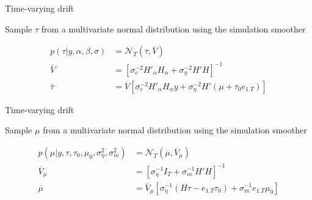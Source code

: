 \documentclass[notes,blackandwhite,mathsans,usenames,dvipsnames]{beamer}
\begin{document}
\begin{frame}{Time-varying drift}

{\color{mcxs2}Sample} $\tau$ {\color{mcxs2}from a multivariate normal distribution using the simulation smoother}

\begin{align*}
p\left( \tau|y,\alpha,\beta,\sigma \right)&= \mathcal{N}_T\left(\overline{\tau},\overline{V}\right)\\[2ex]
\overline{V} &= \left[\sigma^{-2} _eH'_\alpha H_\alpha + \sigma^{-2} _\eta H' H \right]^{-1}\\
\overline{\tau} &= \overline{V}\left[\sigma^{-2} _eH'_\alpha H_\alpha y + \sigma^{-2} _\eta H' (\mu + \tau_0e_{1.T}) \right]
\end{align*}

\end{frame}






\begin{frame}{Time-varying drift}

{\color{mcxs2}Sample} $\mu$ {\color{mcxs2}from a multivariate normal distribution using the simulation smoother}

\begin{align*}
p\left( \mu|y,\tau,\tau_0,\mu_0,\sigma^2_\eta,\sigma^2_m \right)&= \mathcal{N}_T\left(\overline{\mu},\overline{V}_\mu\right)\\[2ex]
\overline{V}_\mu &= \left[ \sigma_\eta^{-1}I_T + \sigma_m^{-1}H'H \right]^{-1} \\
\overline{\mu} &= \overline{V}_\mu\left[ \sigma_\eta^{-1}(H\tau-e_{1.T}\tau_0) + \sigma_m^{-1}e_{1.T}\mu_0\right]
\end{align*}

\end{frame}
\end{document}
